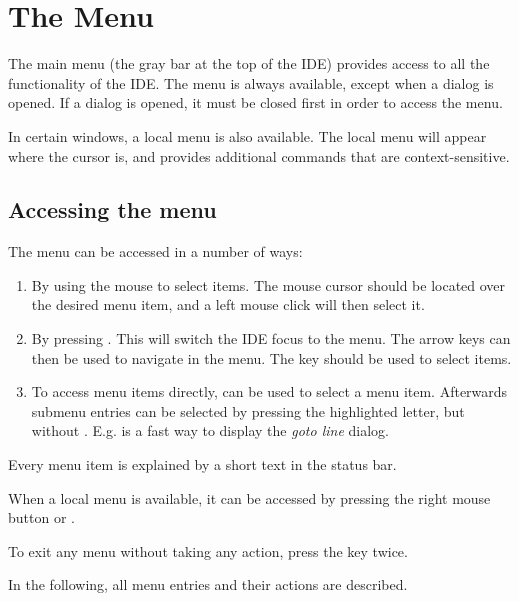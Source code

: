 
\section{The Menu}
\label{se:idemenu}
The main menu (the gray bar at the top of the IDE) provides access to all the
functionality of the IDE. The menu is always available, except when a dialog is opened. If a
dialog is opened, it must be closed first in order to access the menu.

In certain windows, a local menu is also available. The local menu will
appear where the cursor is, and provides additional commands that are
context-sensitive.
%
%
\subsection{Accessing the menu}
The menu can be accessed in a number of ways:
\begin{enumerate}
\item By using the mouse to select items. The mouse cursor should be located
over the desired menu item, and a left mouse click will then select it.
\item By pressing . This will switch the IDE focus to the menu.
The arrow keys can then be used to navigate in the menu. The
 key should be used to select items.
\item To access menu items directly, 
can be used to select a menu item. Afterwards submenu entries can be selected
by pressing the highlighted letter, but without .
E.g.  is a fast way to display the \emph{goto line} dialog.
\end{enumerate}
Every menu item is explained by a short text in the status bar.

When a local menu is available, it can be accessed by pressing
the right mouse button or .

To exit any menu without taking any action, press the  key
twice.

In the following, all menu entries and their actions are described.
%
%
